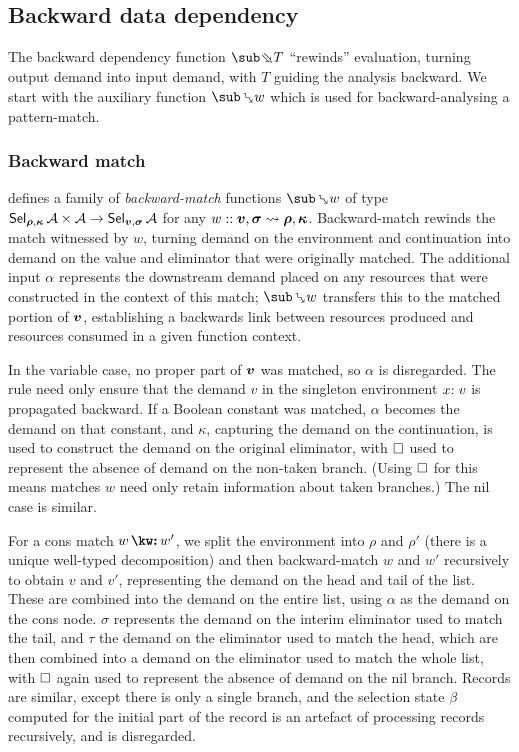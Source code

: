 \subsection{Backward data dependency}
\label{sec:data-dependencies:analyses:bwd}

The backward dependency function $\evalBwdF{T}$ ``rewinds'' evaluation, turning output demand into input demand, with $T$ guiding the analysis backward. We start with the auxiliary function $\matchBwdF{w}$ which is used for backward-analysing a pattern-match.

\subsubsection{Backward match}
\label{sec:data-dependencies:analyses:bwd:pattern-match}

 defines a family of \emph{backward-match} functions $\matchBwdF{w}$ of type $\textup{\textsf{Sel}}_{\bm{\rho}, \bm{\kappa}}\,{\mathcal{A}} \times \mathcal{A} \to \textup{\textsf{Sel}}_{\bm{v}, \bm{\sigma}}\,{\mathcal{A}}$ for any $w :: \bm{v}, \bm{\sigma} \rightsquigarrow \bm{\rho}, \bm{\kappa}$. Backward-match rewinds the match witnessed by $w$, turning demand on the environment and continuation into demand on the value and eliminator that were originally matched. The additional input $\alpha$ represents the downstream demand placed on any resources that were constructed in the context of this match; $\matchBwdF{w}$ transfers this to the matched portion of $\bm{v}$, establishing a backwards link between resources produced and resources consumed in a given function context.



In the variable case, no proper part of $\bm{v}$ was matched, so $\alpha$ is disregarded. The rule need only ensure that the demand $v$ in the singleton environment $x{:}\;v$ is propagated backward. If a Boolean constant was matched, $\alpha$ becomes the demand on that constant, and $\kappa$, capturing the demand on the continuation, is used to construct the demand on the original eliminator, with $\square$ used to represent the absence of demand on the non-taken branch. (Using $\square$ for this means matches $w$ need only retain information about taken branches.) The nil case is similar.

For a cons match $\matchCons{w}{w'}$, we split the environment into $\rho$ and $\rho'$ (there is a unique well-typed decomposition) and then backward-match $w$ and $w'$ recursively to obtain $v$ and $v'$, representing the demand on the head and tail of the list. These are combined into the demand on the entire list, using $\alpha$ as the demand on the cons node. $\sigma$ represents the demand on the interim eliminator used to match the tail, and $\tau$ the demand on the eliminator used to match the head, which are then combined into a demand on the eliminator used to match the whole list, with $\square$ again used to represent the absence of demand on the nil branch. Records are similar, except there is only a single branch, and the selection state $\beta$ computed for the initial part of the record is an artefact of processing records recursively, and is disregarded.

